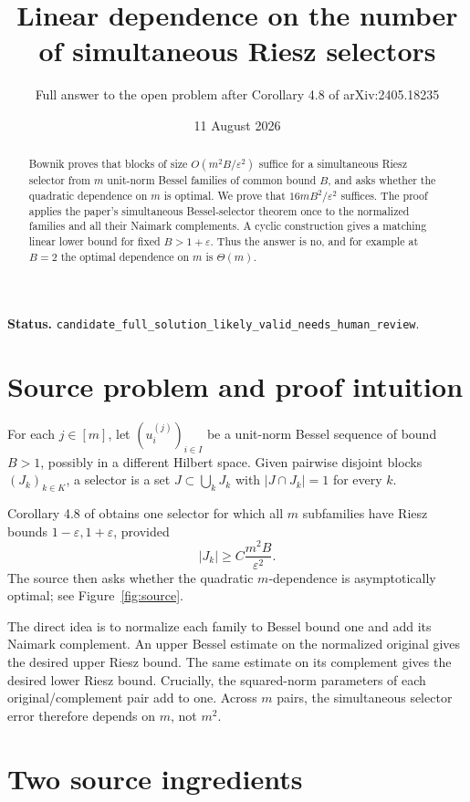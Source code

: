\documentclass[11pt]{article}
\title{Linear dependence on the number of simultaneous Riesz selectors}
\author{Full answer to the open problem after Corollary 4.8 of arXiv:2405.18235}
\date{11 August 2026}
\begin{document}
\maketitle

\noindent\textbf{Status.}
\texttt{candidate\_full\_solution\_likely\_valid\_needs\_human\_review}.

\begin{abstract}
Bownik proves that blocks of size
\(O(m^2B/\varepsilon^2)\) suffice for a simultaneous Riesz selector from
\(m\) unit-norm Bessel families of common bound \(B\), and asks whether the
quadratic dependence on \(m\) is optimal. We prove that
\(16mB^2/\varepsilon^2\) suffices. The proof applies the paper's simultaneous
Bessel-selector theorem once to the normalized families and all their
Naimark complements. A cyclic construction gives a matching linear lower
bound for fixed \(B>1+\varepsilon\). Thus the answer is no, and for example at
\(B=2\) the optimal dependence on \(m\) is \(\Theta(m)\).
\end{abstract}

\section{Source problem and proof intuition}

For each \(j\in[m]\), let \((u_i^{(j)})_{i\in I}\) be a unit-norm Bessel
sequence of bound \(B>1\), possibly in a different Hilbert space. Given
pairwise disjoint blocks \((J_k)_{k\in K}\), a selector is a set
\(J\subset\bigcup_kJ_k\) with \(|J\cap J_k|=1\) for every \(k\).

Corollary 4.8 of \cite{source} obtains one selector for which all \(m\)
subfamilies have Riesz bounds \(1-\varepsilon,1+\varepsilon\), provided
\[
 |J_k|\ge C\frac{m^2B}{\varepsilon^2}.
\]
The source then asks whether the quadratic \(m\)-dependence is asymptotically
optimal; see Figure~\ref{fig:source}.

The direct idea is to normalize each family to Bessel bound one and add its
Naimark complement. An upper Bessel estimate on the normalized original gives
the desired upper Riesz bound. The same estimate on its complement gives the
desired lower Riesz bound. Crucially, the squared-norm parameters of each
original/complement pair add to one. Across \(m\) pairs, the simultaneous
selector error therefore depends on \(m\), not \(m^2\).

\section{Two source ingredients}
\end{document}
